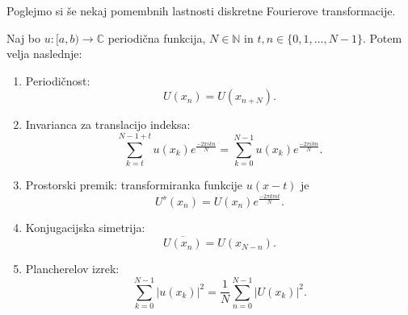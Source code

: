 \documentclass[mat2, tisk]{fmfdelo}
\newcommand{\N}{\mathbb N}
\newcommand{\C}{\mathbb C}
\begin{document}
Poglejmo si še nekaj pomembnih lastnosti diskretne Fourierove transformacije.
\begin{trditev}
Naj bo $u: [a, b) \rightarrow \C$ periodična funkcija, $N\in \N$ in\quad
$t, n \in \{0, 1, \dots, N-1\}$. Potem velja naslednje:
\begin{enumerate}
  \item[i)] Periodičnost:
  \begin{equation*}
    U(x_n) = U(x_{n + N}).
  \end{equation*}
  \item[ii)] Invarianca za translacijo indeksa:
  \begin{equation*}
  \sum_{k=t}^{N-1 + t} u(x_k) e^{\frac{-2\pi i k n}{N}} = \sum_{k=0}^{N-1} u(x_k) e^{\frac{-2\pi i k n}{N}}.
\end{equation*}
  \item[iii)] Prostorski premik: transformiranka funkcije $u(x - t)$ je
  \begin{equation*}
  U^s(x_n) = U(x_n)e^{\frac{-2\pi k m t}{N}} .
\end{equation*}
  \item[iv)] Konjugacijska simetrija: 
  \begin{equation*}
    \overline{U(x_n)} = U(x_{N-n}).
  \end{equation*}
  \item[v)] Plancherelov izrek:
  \begin{equation*}
    \sum_{k=0}^{N-1} |u(x_k)|^2 = \frac{1}{N}\sum_{n=0}^{N-1} |U(x_k)|^2.
  \end{equation*}
\end{enumerate}
\end{trditev}
\end{document}
